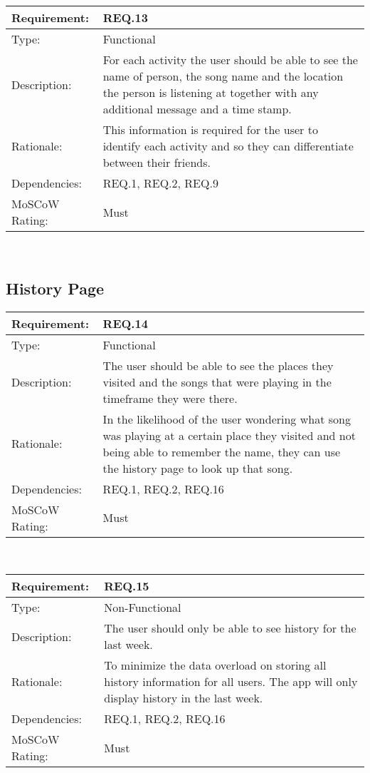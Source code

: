 \noindent
\begin{tabular}{|l || p{12.0cm}|}
  \hline
  Requirement:       & REQ.13 \\ \hline
  Type:              & Functional \\ \hline
  Description:       & For each activity the user should be able to see the name of person, the song name and the location the person is listening at together with any additional message and a time stamp.   \\ \hline
  Rationale:         & This information is required for the user to identify each activity and so they can differentiate between their friends. \\ \hline
  Dependencies:      & REQ.1, REQ.2, REQ.9 \\ \hline
  MoSCoW Rating:     & Must \\ \hline
\end{tabular}\\

\vspace{0.5cm}
\subsection*{History Page}

\noindent
\begin{tabular}{|l || p{12.0cm}|}
  \hline
  Requirement:       & REQ.14 \\ \hline
  Type:              & Functional \\ \hline
  Description:       & The user should be able to see the places they visited and the songs that were playing in the timeframe they were there.  \\ \hline
  Rationale:         & In the likelihood of the user wondering what song was playing at a certain place they visited and not being able to remember the name, they can use the history page to look up that song.  \\ \hline
  Dependencies:      & REQ.1, REQ.2, REQ.16 \\ \hline
  MoSCoW Rating:     & Must \\ \hline
\end{tabular}\\

\vspace{0.5cm}

\noindent
\begin{tabular}{|l || p{12.0cm}|}
  \hline
  Requirement:       & REQ.15 \\ \hline
  Type:              & Non-Functional \\ \hline
  Description:       & The user should only be able to see history for the last week.   \\ \hline
  Rationale:         & To minimize the data overload on storing all history information for all users. The app will only display history in the last week. \\ \hline
  Dependencies:      & REQ.1, REQ.2, REQ.16 \\ \hline
  MoSCoW Rating:     & Must \\ \hline
\end{tabular}\\

